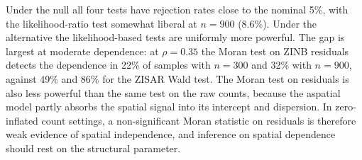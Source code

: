Under the null all four tests have rejection rates close to the nominal 5\%, with the likelihood-ratio test somewhat liberal at $n=900$ (8.6\%).
Under the alternative the likelihood-based tests are uniformly more powerful.
The gap is largest at moderate dependence: at $\rho=0.35$ the Moran test on ZINB residuals detects the dependence in 22\% of samples with $n=300$ and 32\% with $n=900$, against 49\% and 86\% for the ZISAR Wald test.
The Moran test on residuals is also less powerful than the same test on the raw counts, because the aspatial model partly absorbs the spatial signal into its intercept and dispersion.
In zero-inflated count settings, a non-significant Moran statistic on residuals is therefore weak evidence of spatial independence, and inference on spatial dependence should rest on the structural parameter.
